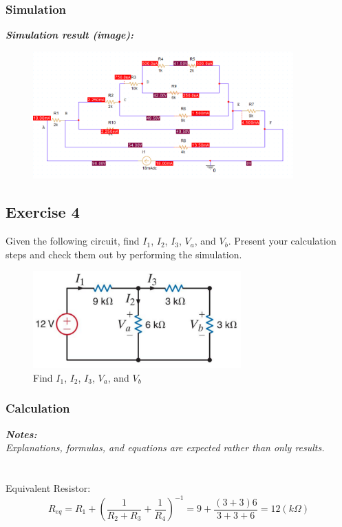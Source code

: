 \subsubsection{Simulation}
\textit{\textbf{Simulation result (image):}}
\begin{figure}[H]
    \centering
    \includegraphics[width = 10cm]{source/picture/bai_1/ex3_sim.png}
\end{figure}
\newpage

\subsection{Exercise 4}
Given the following circuit, find $I_1$, $I_2$, $I_3$, $V_a$, and $V_b$. Present your calculation steps and check them out by performing the simulation.

\begin{figure}[H]
    \centering
    \includegraphics[width = 8cm]{source/picture/bai_1/lab1_ex4_de.png}
    \caption{Find $I_1$, $I_2$, $I_3$, $V_a$, and $V_b$}
    \label{lab1_ex4_de}
\end{figure}

\subsubsection{Calculation}
\textit{\textbf{Notes:}}\\
\textit{Explanations, formulas, and equations are expected rather than only results.}\\
\\ \\
Equivalent Resistor:
$$ R_{eq} = R_1 + \left(\frac{1}{R_2 + R_3} + \frac{1}{R_4} \right)^{-1} = 9 + \frac{(3+3)6}{3 + 3 + 6} = 12(k\Omega) $$

